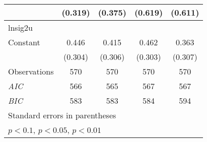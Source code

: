 {\begin{tabular}{l*{4}{c}}
                    &     (0.319)         &     (0.375)         &     (0.619)         &     (0.611)         \\
\hline
lnsig2u             &                     &                     &                     &                     \\
Constant            &       0.446         &       0.415         &       0.462         &       0.363         \\
                    &     (0.304)         &     (0.306)         &     (0.303)         &     (0.307)         \\
\hline
Observations        &         570         &         570         &         570         &         570         \\
\textit{AIC}        &         566         &         565         &         567         &         567         \\
\textit{BIC}        &         583         &         583         &         584         &         594         \\
\hline\hline
\multicolumn{5}{l}{\footnotesize Standard errors in parentheses}\\
\multicolumn{5}{l}{\footnotesize \sym{*} \(p<0.1\), \sym{**} \(p<0.05\), \sym{***} \(p<0.01\)}\\
\end{tabular}
}
